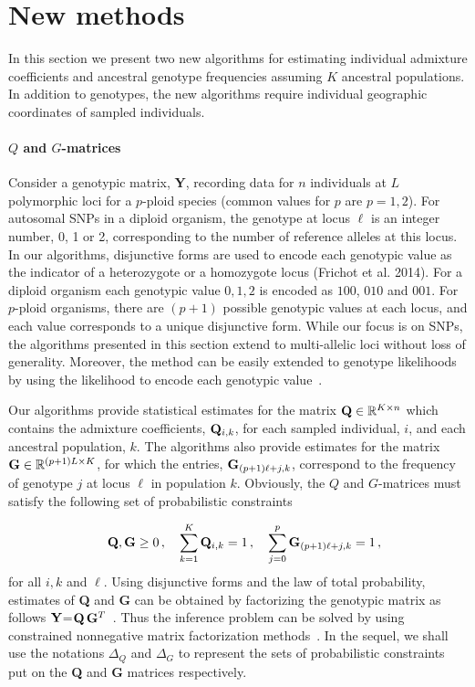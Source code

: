 \clearpage
\newpage

\section{New methods}


In this section we present two new algorithms for estimating individual
admixture coefficients and ancestral genotype frequencies assuming $K$ ancestral
populations. In addition to genotypes, the new algorithms require individual
geographic coordinates of sampled individuals.

\paragraph{$Q$ and $G$-matrices} Consider a genotypic matrix, {\bf Y}, recording
data for $n$ individuals at $L$ polymorphic loci for a $p$-ploid species (common
values for $p$ are $p = 1,2$). For autosomal SNPs in a diploid organism, the
genotype at locus $\ell$ is an integer number, 0, 1 or 2, corresponding to the
number of reference alleles at this locus. In our algorithms, disjunctive forms
are used to encode each genotypic value as the indicator of a heterozygote or a
homozygote locus (Frichot et al. 2014). For a diploid organism each genotypic
value $0,1,2$ is encoded as $100$, $010$ and $001$. For $p$-ploid organisms,
there are $(p+1)$ possible genotypic values at each locus, and each value
corresponds to a unique disjunctive form. While our focus is on SNPs, the
algorithms presented in this section extend to multi-allelic loci without loss
of generality. Moreover, the method can be easily extended to genotype
likelihoods by using the likelihood to encode each genotypic
value~\citep{Korneliussen2014}.

Our algorithms provide statistical estimates for the matrix ${\bf Q} \in
\mathbb{R}^{K \times n}$ which contains the admixture coefficients, ${\bf
  Q}_{i,k}$, for each sampled individual, $i$, and each ancestral population,
$k$. The algorithms also provide estimates for the matrix ${\bf G} \in
\mathbb{R}^{(p+1)L \times K}$, for which the entries, ${\bf G}_{(p+1)\ell + j,
  k}$, correspond to the frequency of genotype $j$ at locus $\ell$ in population
$k$. Obviously, the $Q$ and $G$-matrices must satisfy the following set of
probabilistic constraints

$$
\quad {\bf Q},{\bf G} \geq 0 \, , \quad \sum_{k=1}^K {\bf Q}_{i,k} = 1 \, ,
\quad \sum_{j=0}^p {\bf G}_{(p+1)\ell + j, k} = 1 \, ,
$$
for all $i, k$ and $\ell$. Using disjunctive forms and the law of total
probability, estimates of {\bf Q} and {\bf G} can be obtained by factorizing the
genotypic matrix as follows ${\bf Y}$=${\bf Q}\,{\bf G}^T$~\citep{Frichot2014}.
Thus the inference problem can be solved by using constrained nonnegative matrix
factorization methods~\citep{Lee1999, Cichocki2009}. In the sequel, we shall use
the notations $\Delta_Q$ and $\Delta_G$ to represent the sets of probabilistic
constraints put on the {\bf Q} and {\bf G} matrices respectively.


